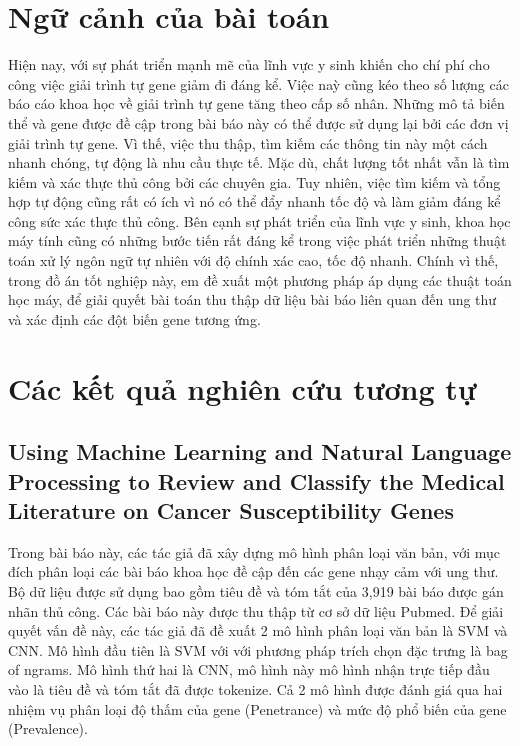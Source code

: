 \documentclass[../DoAn.tex]{subfiles}
\begin{document}
\section{Ngữ cảnh của bài toán}
Hiện nay, với sự phát triển mạnh mẽ của lĩnh vực y sinh khiến cho chí phí cho công việc giải trình tự gene giảm đi đáng kể. Việc naỳ cũng kéo theo số lượng các báo cáo khoa học về giải trình tự gene tăng theo cấp số nhân. Những mô tả biến thể và gene được đề cập trong bài báo này có thể được sử dụng lại bởi các đơn vị giải trình tự gene. Vì thế, việc thu thập, tìm kiếm các thông tin này một cách nhanh chóng, tự động là nhu cầu thực tế. Mặc dù, chất lượng tốt nhất vẫn là tìm kiếm và xác thực thủ công bởi các chuyên gia. Tuy nhiên, việc tìm kiếm và tổng hợp tự động cũng rất có ích vì nó có thể đẩy nhanh tốc độ và làm giảm đáng kể công sức xác thực thủ công. Bên cạnh sự phát triển của lĩnh vực y sinh, khoa học máy tính cũng có những bước tiến rất đáng kể trong việc phát triển những thuật toán xử lý ngôn ngữ tự nhiên với độ chính xác cao, tốc độ nhanh. Chính vì thế, trong đồ án tốt nghiệp này, em đề xuất một phương pháp áp dụng các thuật toán học máy, để giải quyết bài toán thu thập dữ liệu bài báo liên quan đến ung thư và xác định các đột biến gene tương ứng.

\section{Các kết quả nghiên cứu tương tự}
\subsection{Using Machine Learning and Natural Language Processing to Review and Classify the Medical Literature on Cancer Susceptibility Genes}
Trong bài báo này, các tác giả đã xây dựng mô hình phân loại văn bản, với mục đích phân loại các bài báo khoa học đề cập đến các gene nhạy cảm với ung thư. Bộ dữ liệu được sử dụng bao gồm tiêu đề và tóm tắt của 3,919 bài báo được gán nhãn thủ công. Các bài báo này được thu thập từ cơ sở dữ liệu Pubmed. Để giải quyết vấn đề này, các tác giả đã đề xuất 2 mô hình phân loại văn bản là SVM và CNN. 
Mô hình đầu tiên là SVM với với phương pháp trích chọn đặc trưng là bag of ngrams. Mô hình thứ hai là CNN, mô hình này mô hình nhận trực tiếp đầu vào là tiêu đề và tóm tắt đã được tokenize. Cả 2 mô hình được đánh giá qua hai nhiệm vụ phân loại độ thấm của gene (Penetrance) và mức độ phổ biến của gene (Prevalence). 
\end{document}
